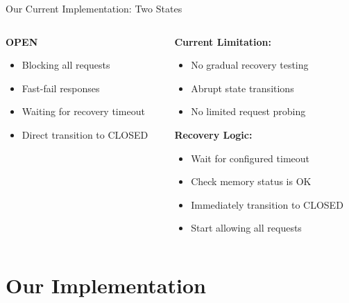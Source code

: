 \documentclass[aspectratio=169]{beamer}
\newcommand{\circuitopen}{\textcolor{red}{\faTimesCircle}}
\newcommand{\alertred}[1]{\textcolor{red}{#1}}
\begin{document}
\begin{frame}{Our Current Implementation: Two States}
\begin{columns}
\begin{column}{0.5\textwidth}
            \textbf{OPEN} \circuitopen
            \begin{itemize}
                \item Blocking all requests
                \item Fast-fail responses
                \item Waiting for recovery timeout
                \item Direct transition to CLOSED
            \end{itemize}
        \end{column}
        \begin{column}{0.5\textwidth}
            \textbf{Current Limitation:}
            \begin{itemize}
                \item[\alertred{\faTimes}] No gradual recovery testing
                \item[\alertred{\faTimes}] Abrupt state transitions
                \item[\alertred{\faTimes}] No limited request probing
            \end{itemize}
            
            \textbf{Recovery Logic:}
            \begin{itemize}
                \item Wait for configured timeout
                \item Check memory status is OK
                \item Immediately transition to CLOSED
                \item Start allowing all requests
            \end{itemize}
        \end{column}
    \end{columns}
\end{frame}

\section{Our Implementation}
\end{document}
